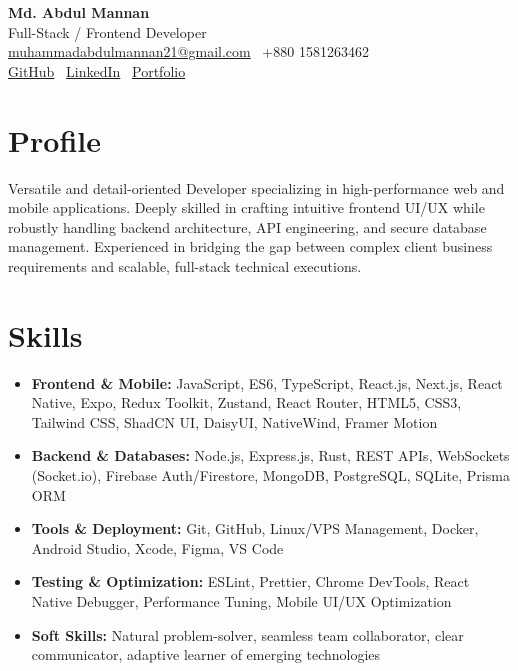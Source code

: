 \documentclass[a4paper,10pt]{article}
\begin{document}
\begin{center}
    {\LARGE \textbf{Md. Abdul Mannan}}\\[1mm]
    Full-Stack / Frontend Developer\\[0.5mm]
    \href{mailto:muhammadabdulmannan21@gmail.com}{muhammadabdulmannan21@gmail.com} \textbar\ +880 1581263462\\
    \href{https://github.com/muhammadAbdulMannan2022}{GitHub} \textbar\ 
    \href{https://www.linkedin.com/in/muhammad-abdul-mannan-625299280/}{LinkedIn} \textbar\
    \href{https://abdulmannandev.vercel.app/}{Portfolio}
\end{center}
\vspace{-2mm}
\vspace{2mm}

\section*{Profile}
\vspace{2mm}
Versatile and detail-oriented Developer specializing in high-performance web and mobile applications. Deeply skilled in crafting intuitive frontend UI/UX while robustly handling backend architecture, API engineering, and secure database management. Experienced in bridging the gap between complex client business requirements and scalable, full-stack technical executions.

\section*{Skills}
\vspace{2mm}
\begin{itemize}
    \item \textbf{Frontend \& Mobile:} JavaScript, ES6, TypeScript, React.js, Next.js, React Native, Expo, Redux Toolkit, Zustand, React Router, HTML5, CSS3, Tailwind CSS, ShadCN UI, DaisyUI, NativeWind, Framer Motion
    \item \textbf{Backend \& Databases:} Node.js, Express.js, Rust, REST APIs, WebSockets (Socket.io), Firebase Auth/Firestore, MongoDB, PostgreSQL, SQLite, Prisma ORM
    \item \textbf{Tools \& Deployment:} Git, GitHub, Linux/VPS Management, Docker, Android Studio, Xcode, Figma, VS Code
    \item \textbf{Testing \& Optimization:} ESLint, Prettier, Chrome DevTools, React Native Debugger, Performance Tuning, Mobile UI/UX Optimization
    \item \textbf{Soft Skills:} Natural problem-solver, seamless team collaborator, clear communicator, adaptive learner of emerging technologies
\end{itemize}
\end{document}
